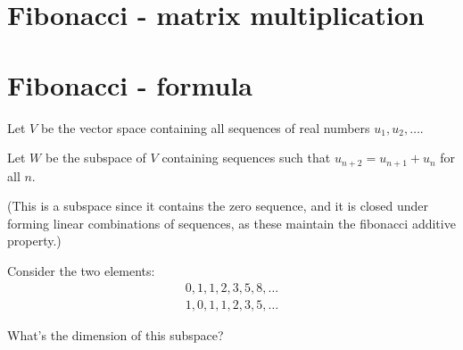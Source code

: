 \documentclass[12pt]{article}
\begin{document}
\section{Fibonacci - matrix multiplication}

\section{Fibonacci - formula}

Let $V$ be the vector space containing all sequences of real numbers
$u_1, u_2, \ldots$.

Let $W$ be the subspace of $V$ containing sequences such that
$u_{n+2} = u_{n+1} + u_n$ for all $n$.

(This is a subspace since it contains the zero sequence, and it is closed under
forming linear combinations of sequences, as these maintain the fibonacci
additive property.)

Consider the two elements:
\begin{align*}
  0, 1, 1, 2, 3, 5, 8, \ldots\\
  1, 0, 1, 1, 2, 3, 5, \ldots
\end{align*}

What's the dimension of this subspace?
\end{document}
